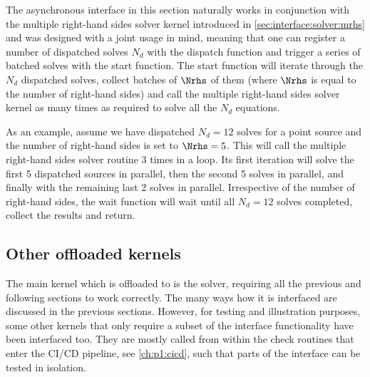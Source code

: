 The asynchronous interface in this section naturally works in conjunction with the multiple right-hand sides solver kernel introduced in \cref{sec:interface:solver:mrhs} and was designed with a joint usage in mind, meaning that one can register a number of dispatched solves $N_d$ with the dispatch function and trigger a series of batched solves with the start function.
The start function will iterate through the $N_d$ dispatched solves, collect batches of $\Nrhs$ of them (where $\Nrhs$ is equal to the number of right-hand sides) and call the multiple right-hand sides solver kernel as many times as required to solve all the $N_d$ equations. %

As an example, assume we have dispatched $N_d=12$ solves for a point source and the number of right-hand sides is set to $\Nrhs=5$.
This will call the multiple right-hand sides solver routine \num{3} times in a loop.
Its first iteration will solve the first \num{5} dispatched sources in parallel, then the second \num{5} solves in parallel, and finally with the remaining last \num{2} solves in parallel.
Irrespective of the number of right-hand sides, the wait function will wait until all $N_d=12$ solves completed, collect the results and return.

\subsection{Other offloaded kernels}

The main kernel which is offloaded to \quda is the solver, requiring all the previous and following sections to work correctly.
The many ways how it is interfaced are discussed in the previous sections.
However, for testing and illustration purposes, some other kernels that only require a subset of the interface functionality have been interfaced too.
They are mostly called from within the check routines that enter the CI/CD pipeline, see \cref{ch:p1:cicd}, such that parts of the interface can be tested in isolation.

